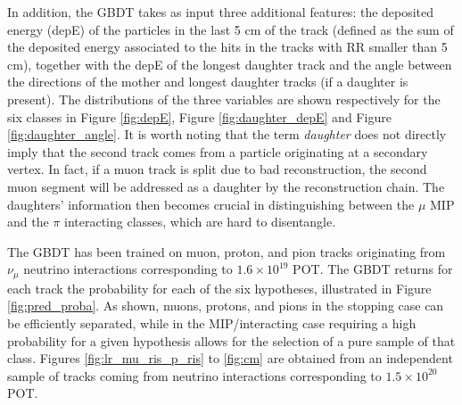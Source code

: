 \documentclass[nocopyright]{cimento}
\begin{document}
In addition, the GBDT takes as input three additional features: the deposited energy (depE) of the particles in the last 5 cm of the track (defined as the sum of the deposited energy associated to the hits in the tracks with RR smaller than 5 cm), together with the depE of the longest daughter track and the angle between the directions of the mother and longest daughter tracks (if a daughter is present).
The distributions of the three variables are shown respectively for the six classes in Figure \ref{fig:depE}, Figure \ref{fig:daughter_depE} and Figure \ref{fig:daughter_angle}. It is worth noting that the term \textit{daughter} does not directly imply that the second track comes from a particle originating at a secondary vertex. In fact, if a muon track is split due to bad reconstruction, the second muon segment will be addressed as a daughter by the reconstruction chain. The daughters' information then becomes crucial in distinguishing between the $\mu$ MIP and the $\pi$ interacting classes, which are hard to disentangle.

The GBDT has been trained on muon, proton, and pion tracks originating from $\nu_\mu$ neutrino interactions corresponding to $1.6\times10^{19}$ POT.
The GBDT returns for each track the probability for each of the six hypotheses, illustrated in Figure \ref{fig:pred_proba}. As shown, muons, protons, and pions in the stopping case can be efficiently separated, while in the MIP/interacting case requiring a high probability for a given hypothesis allows for the selection of a pure sample of that class.
Figures \ref{fig:lr_mu_ris_p_ris} to \ref{fig:cm}
are obtained from an independent sample of tracks coming from neutrino interactions corresponding to $1.5\times10^{20}$ POT.
\end{document}
